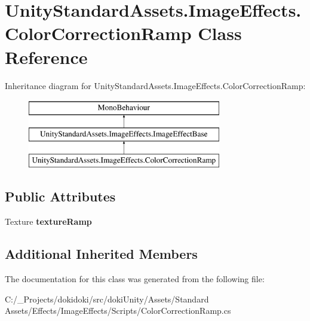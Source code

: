 \hypertarget{class_unity_standard_assets_1_1_image_effects_1_1_color_correction_ramp}{}\section{Unity\+Standard\+Assets.\+Image\+Effects.\+Color\+Correction\+Ramp Class Reference}
\label{class_unity_standard_assets_1_1_image_effects_1_1_color_correction_ramp}
Inheritance diagram for Unity\+Standard\+Assets.\+Image\+Effects.\+Color\+Correction\+Ramp\+:\begin{figure}[H]
\begin{center}
\leavevmode
\includegraphics[height=3.000000cm]{class_unity_standard_assets_1_1_image_effects_1_1_color_correction_ramp}
\end{center}
\end{figure}
\subsection*{Public Attributes}
\begin{DoxyCompactItemize}
\item 
Texture {\bfseries texture\+Ramp}\hypertarget{class_unity_standard_assets_1_1_image_effects_1_1_color_correction_ramp_abaa9ce0104edfaafeea9614c908b76cc}{}\label{class_unity_standard_assets_1_1_image_effects_1_1_color_correction_ramp_abaa9ce0104edfaafeea9614c908b76cc}

\end{DoxyCompactItemize}
\subsection*{Additional Inherited Members}


The documentation for this class was generated from the following file\+:\begin{DoxyCompactItemize}
\item 
C\+:/\+\_\+\+Projects/dokidoki/src/doki\+Unity/\+Assets/\+Standard Assets/\+Effects/\+Image\+Effects/\+Scripts/Color\+Correction\+Ramp.\+cs\end{DoxyCompactItemize}
